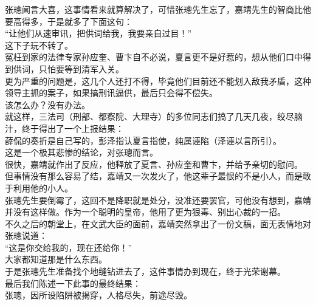 \begin{multicols}{\theparacolNo}
张璁闻言大喜，这事情看来就算解决了，可惜张璁先生忘了，嘉靖先生的智商比他要高得多，于是就多了下面这句：\\

“让他们从速审讯，把供词给我，我要亲自过目！”\\

这下子玩不转了。\\

冤枉到家的法律专家孙应奎、曹卞自不必说，夏言更不是好惹的，想从他们口中得到供词，只怕要等到清军入关。\\

更为严重的问题是，这几个人还打不得，毕竟他们目前还不能划入敌我矛盾，这种领导主抓的案子，如果搞刑讯逼供，最后只会得不偿失。\\

该怎么办？没有办法。\\

就这样，三法司（刑部、都察院、大理寺）的多位同志们搞了几天几夜，绞尽脑汁，终于得出了一个上报结果：\\

薛侃的奏折是自己写的，彭泽指认夏言指使，纯属诬陷（泽诬以言所引）。\\

这是一个极其悲惨的结论，对张璁而言。\\

很快，嘉靖就作出了反应，他释放了夏言、孙应奎和曹卞，并给予亲切的慰问。\\

但事情没有那么容易了结，嘉靖又一次发火了，他这辈子最恨的不是小人，而是敢于利用他的小人。\\

张璁先生要倒霉了，这回不是降职就是处分，没准还要罢官，可他没有想到，嘉靖并没有这样做。作为一个聪明的皇帝，他用了更为狠毒、别出心裁的一招。\\

不久之后的朝堂上，在文武大臣的面前，嘉靖突然拿出了一份文稿，面无表情地对张璁说道：\\

“这是你交给我的，现在还给你！”\\

大家都知道那是什么东西。\\

于是张璁先生准备找个地缝钻进去了，这件事情办到现在，终于光荣谢幕。\\

最后我们陈述一下此事的最终结果：\\

张璁，因所设陷阱被揭穿，人格尽失，前途尽毁。\\


\end{multicols}
